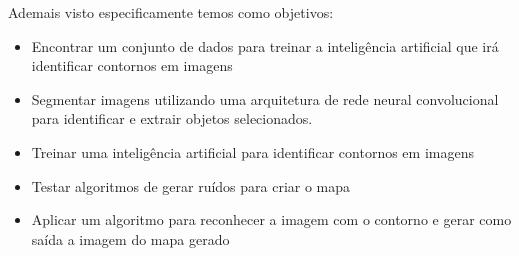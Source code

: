 Ademais visto especificamente temos como objetivos:

\begin{itemize}
	\item Encontrar um conjunto de dados para treinar a inteligência artificial que irá identificar contornos em imagens
	\item Segmentar imagens utilizando uma arquitetura de rede neural convolucional para identificar e extrair objetos selecionados.
	\item Treinar uma inteligência artificial para identificar contornos em imagens
	\item Testar algoritmos de gerar ruídos para criar o mapa
	\item Aplicar um algoritmo para reconhecer a imagem com o contorno e gerar como saída a imagem do mapa gerado
\end{itemize}

